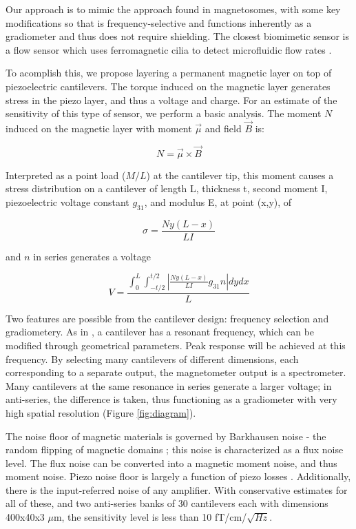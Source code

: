 Our approach is to mimic the approach found in magnetosomes, with some key modifications so that is frequency-selective and functions inherently as a gradiometer and thus does not require shielding. The closest biomimetic sensor is a flow sensor which uses ferromagnetic cilia to detect microfluidic flow rates \cite{alfadhel2014magnetic}.


To acomplish this, we propose layering a permanent magnetic layer on top of piezoelectric cantilevers. The torque induced on the magnetic layer generates stress in the piezo layer, and thus a voltage and charge. For an estimate of the sensitivity of this type of sensor, we perform a basic analysis. The moment $N$ induced on the magnetic layer with moment $\vec{\mu}$ and field $\vec{B}$ is:

$$  N=\vec{\mu} \times \vec{B} $$

Interpreted as a point load ($M/L$) at the cantilever tip, this moment causes a stress distribution on a cantilever of length L, thickness t, second moment I, piezoelectric voltage constant $g_{31}$, and modulus E, at point (x,y), of

$$ \sigma=\frac{Ny(L-x)}{LI} $$

and $n$ in series generates a voltage

$$ V=\frac{\int_0^L\int_{-t/2}^{t/2}\left|\frac{Ny(L-x)}{LI}g_{31}n\right|dydx}{L} $$

Two features are possible from the cantilever design: frequency selection and gradiometery. As in \cite{shen2008design}, a cantilever has a resonant frequency, which can be modified through geometrical parameters. Peak response will be achieved at this frequency. By selecting many cantilevers of different dimensions, each corresponding to a separate output, the magnetometer output is a spectrometer. Many cantilevers at the same resonance in series generate a larger voltage; in anti-series, the difference is taken, thus functioning as a gradiometer with very high spatial resolution (Figure \ref{fig:diagram}).

The noise floor of magnetic materials is governed by Barkhausen noise - the random flipping of magnetic domains \cite{butta2012sources}; this noise is characterized as a flux noise level. The flux noise can be converted into a magnetic moment noise, and thus moment noise. Piezo noise floor is largely a function of piezo losses \cite{levinzon2004fundamental}. Additionally, there is the input-referred noise of any amplifier. With conservative estimates for all of these, and two anti-series banks of 30 cantilevers each with dimensions 400x40x3 $\mu$m, the sensitivity level is less than 10 fT/cm/$\sqrt{Hz}$.

